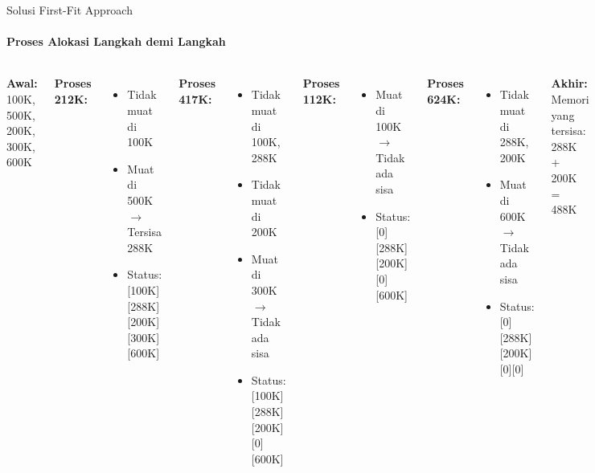 \documentclass[10pt,aspectratio=169]{beamer}
\begin{document}
\begin{frame}{Solusi First-Fit Approach}
    \framesubtitle{Proses Alokasi Langkah demi Langkah}
    
    \begin{columns}[T]
            \textbf{Awal:} 100K, 500K, 200K, 300K, 600K
            
            \textbf{Proses 212K:}
            \begin{itemize}
                \item Tidak muat di 100K
                \item Muat di 500K $\rightarrow$ Tersisa 288K
                \item Status: [100K][288K][200K][300K][600K]
            \end{itemize}
            
            \textbf{Proses 417K:}
            \begin{itemize}
                \item Tidak muat di 100K, 288K
                \item Tidak muat di 200K
                \item Muat di 300K $\rightarrow$ Tidak ada sisa
                \item Status: [100K][288K][200K][0][600K]
            \end{itemize}
            
            \textbf{Proses 112K:}
            \begin{itemize}
                \item Muat di 100K $\rightarrow$ Tidak ada sisa
                \item Status: [0][288K][200K][0][600K]
            \end{itemize}
            
            \textbf{Proses 624K:}
            \begin{itemize}
                \item Tidak muat di 288K, 200K
                \item Muat di 600K $\rightarrow$ Tidak ada sisa
                \item Status: [0][288K][200K][0][0]
            \end{itemize}
            
            \textbf{Akhir:} Memori yang tersisa: 288K + 200K = 488K
    \end{columns}
\end{frame}
\end{document}
